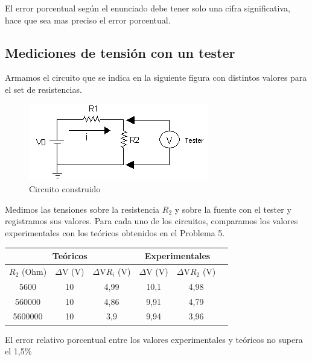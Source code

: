 \documentclass{article}
\begin{document}
El error porcentual según el enunciado debe tener solo una cifra significativa, hace que sea mas preciso el error porcentual.

\subsection{Mediciones de tensión con un tester}

Armamos el circuito que se indica en la siguiente figura con distintos valores para el set de resistencias.

\begin{figure}[H]
\centering
\includegraphics[scale=0.6]{ParteC.png}
\caption{Circuito construido}
\label{fig:1}
\end{figure}

Medimos las tensiones sobre la resistencia $R_2$ y sobre la fuente con el tester y registramos sus valores.
Para cada uno de los circuitos, comparamos los valores experimentales con los teóricos obtenidos en el Problema 5.

\begin{table}[H]
\centering
\begin{tabular}{|c|c|c|c|c|c|}
\hline
\multicolumn{3}{|c|}{Teóricos}&\multicolumn{2}{|c|}{Experimentales}\\\hline
$R_2$ (Ohm) & $\Delta$V (V) & $\Delta$V$R_i$ (V) & $\Delta$V (V) & $\Delta$V$R_2$ (V)\\\hline
5600        & 10            & 4,99               & 10,1          & 4,98\\\hline
560000      & 10            & 4,86               & 9,91          & 4,79\\\hline
5600000     & 10            & 3,9                & 9,94          & 3,96\\\hline
\end{tabular}
\end{table}

El error relativo porcentual entre los valores experimentales y teóricos no supera el 1,5\%
\end{document}
